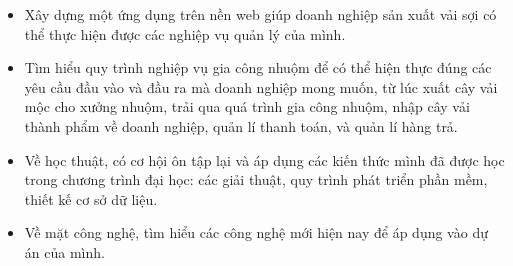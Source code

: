 \begin{itemize}
  \item Xây dựng một ứng dụng trên nền web giúp doanh nghiệp sản xuất vải sợi có thể thực hiện được các nghiệp vụ quản lý của mình.
  \item Tìm hiểu quy trình nghiệp vụ gia công nhuộm để có thể hiện thực đúng các yêu cầu đầu vào và đầu ra mà doanh nghiệp mong muốn, từ lúc xuất cây vải mộc cho xưởng nhuộm, trải qua quá trình gia công nhuộm, nhập cây vải thành phẩm về doanh nghiệp, quản lí thanh toán,  và quản lí hàng trả.
  \item Về học thuật, có cơ hội ôn tập lại và áp dụng các kiến thức mình đã được học trong chương trình đại học: các giải thuật, quy trình phát triển phần mềm, thiết kế cơ sở dữ liệu.
  \item Về mặt công nghệ, tìm hiểu các công nghệ mới hiện nay để áp dụng vào dự án của mình.
\end{itemize}